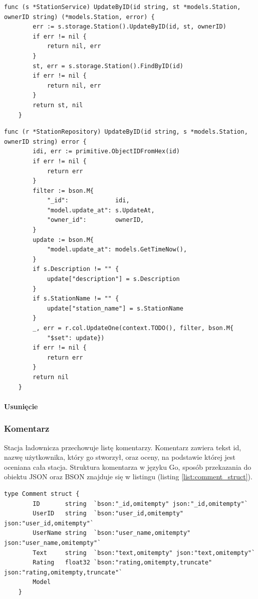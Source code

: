 
\begin{lstlisting}[label=list:service_station_UpdateByID,caption=Serwis edycji stacji ładowniczej,basicstyle=\tiny\ttfamily]
    func (s *StationService) UpdateByID(id string, st *models.Station, ownerID string) (*models.Station, error) {
        err := s.storage.Station().UpdateByID(id, st, ownerID)
        if err != nil {
            return nil, err
        }
        st, err = s.storage.Station().FindByID(id)
        if err != nil {
            return nil, err
        }
        return st, nil
    }
\end{lstlisting}
\begin{lstlisting}[label=list:repo_station_UpdateByID,caption=Edycja stacji ładowniczej w bazie danych,basicstyle=\tiny\ttfamily]
    func (r *StationRepository) UpdateByID(id string, s *models.Station, ownerID string) error {
        idi, err := primitive.ObjectIDFromHex(id)
        if err != nil {
            return err
        }
        filter := bson.M{
            "_id":             idi,
            "model.update_at": s.UpdateAt,
            "owner_id":        ownerID,
        }
        update := bson.M{
            "model.update_at": models.GetTimeNow(),
        }
        if s.Description != "" {
            update["description"] = s.Description
        }
        if s.StationName != "" {
            update["station_name"] = s.StationName
        }
        _, err = r.col.UpdateOne(context.TODO(), filter, bson.M{
            "$set": update})
        if err != nil {
            return err
        }
        return nil
    }
\end{lstlisting}

\paragraph{Usunięcie}
\subsubsection{Komentarz}
Stacja ładownicza przechowuje listę komentarzy. Komentarz zawiera tekst id, nazwę użytkownika, który go stworzył, oraz oceny, na podstawie której jest oceniana cała stacja.
Struktura komentarza w języku Go, sposób przekazania do obiektu JSON oraz BSON znajduje się w listingu (listing \ref{list:comment_struct}).
\begin{lstlisting}[label=list:comment_struct,caption=Struktura komentarza,basicstyle=\tiny\ttfamily]
    type Comment struct {
        ID       string  `bson:"_id,omitempty" json:"_id,omitempty"`
        UserID   string  `bson:"user_id,omitempty" json:"user_id,omitempty"`
        UserName string  `bson:"user_name,omitempty" json:"user_name,omitempty"`
        Text     string  `bson:"text,omitempty" json:"text,omitempty"`
        Rating   float32 `bson:"rating,omitempty,truncate" json:"rating,omitempty,truncate"`
        Model
    }
\end{lstlisting}

